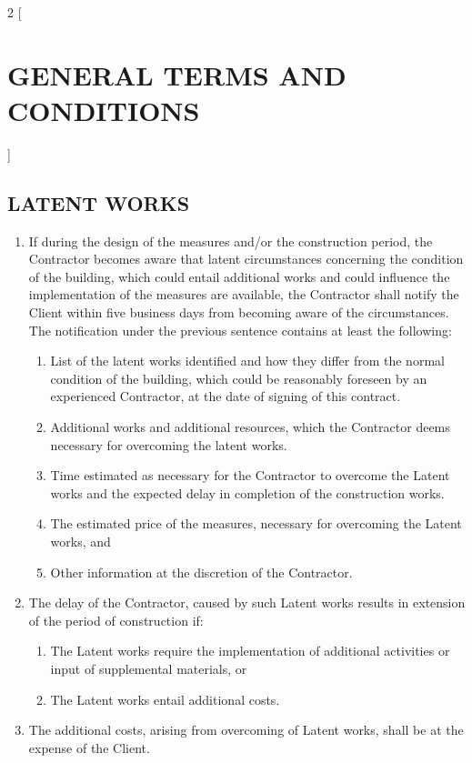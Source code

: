 \begin{multicols}{2} [\section{GENERAL TERMS AND CONDITIONS}]
      \subsection{LATENT WORKS}
      \begin{enumerate}
      \item If during the design of the measures and/or the
        construction period, the Contractor becomes aware that latent
        circumstances concerning the condition of the building, which
        could entail additional works and could influence the
        implementation of the measures are available, the Contractor
        shall notify the Client within five business days from
        becoming aware of the circumstances. The notification under
        the previous sentence contains at least the following:
        \begin{enumerate}
        \item List of the latent works identified and how they differ
          from the normal condition of the building, which could be
          reasonably foreseen by an experienced Contractor, at the
          date of signing of this contract.
        \item Additional works and additional resources, which the
          Contractor deems necessary for overcoming the latent works.
        \item Time estimated as necessary for the Contractor to
          overcome the Latent works and the expected delay in
          completion of the construction works.
        \item The estimated price of the measures, necessary for
          overcoming the Latent works, and
        \item Other information at the discretion of the Contractor.
        \end{enumerate}
      \item The delay of the Contractor, caused by such Latent works
        results in extension of the period of construction if:
        \begin{enumerate}
        \item The Latent works require the implementation of
          additional activities or input of supplemental materials, or
        \item The Latent works entail additional costs.
        \end{enumerate}
      \item The additional costs, arising from overcoming of Latent
        works, shall be at the expense of the Client.
      \end{enumerate}


\end{multicols}
